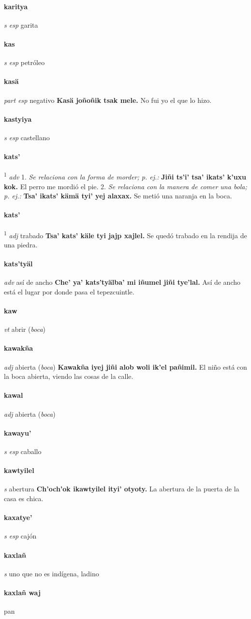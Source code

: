 \documentclass{scrbook}
\newcommand{\entry}[1]{\paragraph{#1}}
\newcommand{\onedefinition}[1]{#1.}
\newcommand{\defsuperscript}[1]{\textsuperscript{1}}
\newcommand{\nontranslationdef}[1]{\textit{#1}}
\newcommand{\partofspeech}[1]{\textit{#1}}
\newcommand{\spanishtranslation}[1]{#1}
\newcommand{\clarification}[1]{(\textit{#1})}
\newcommand{\cholexample}[1]{\textbf{#1}}
\newcommand{\exampletranslation}[1]{#1}
\begin{document}
\begin{multicols}{2}
\entry{karitya}
\partofspeech{s esp}
\spanishtranslation{garita}

\entry{kas}
\partofspeech{s esp}
\spanishtranslation{petróleo}

\entry{kasä}
\partofspeech{part esp}
\spanishtranslation{negativo}
\cholexample{Kasä joñoñik tsak mele.}
\exampletranslation{No fui yo el que lo hizo.}

\entry{kastyiya}
\partofspeech{s esp}
\spanishtranslation{castellano}

\entry{kats'}
\defsuperscript{1}
\partofspeech{adv}
\onedefinition{1}
\nontranslationdef{Se relaciona con la forma de morder; p. ej.:}
\cholexample{Jiñi ts'i' tsa' ikats' k'uxu kok.}
\exampletranslation{El perro me mordió el pie.}
\onedefinition{2}
\nontranslationdef{Se relaciona con la manera de comer una bola; p. ej.:}
\cholexample{Tsa' ikats' kämä tyi' yej alaxax.}
\exampletranslation{Se metió una naranja en la boca.}

\entry{kats'}
\defsuperscript{2}
\partofspeech{adj}
\spanishtranslation{trabado}
\cholexample{Tsa' kats' käle tyi jajp xajlel.}
\exampletranslation{Se quedó trabado en la rendija de una piedra.}

\entry{kats'tyäl}
\partofspeech{adv}
\spanishtranslation{así de ancho}
\cholexample{Che' ya' kats'tyälba' mi iñumel jiñi tye'lal.}
\exampletranslation{Así de ancho está el lugar por donde pasa el tepezcuintle.}

\entry{kaw}
\partofspeech{vt}
\spanishtranslation{abrir}
\clarification{boca}

\entry{kawakña}
\partofspeech{adj}
\spanishtranslation{abierta}
\clarification{boca}
\cholexample{Kawakña iyej jiñi alob woli ik'el pañimil.}
\exampletranslation{El niño está con la boca abierta, viendo las cosas de la calle.}

\entry{kawal}
\partofspeech{adj}
\spanishtranslation{abierta}
\clarification{boca}

\entry{kawayu'}
\partofspeech{s esp}
\spanishtranslation{caballo}

\entry{kawtyilel}
\partofspeech{s}
\spanishtranslation{abertura}
\cholexample{Ch'och'ok ikawtyilel ityi' otyoty.}
\exampletranslation{La abertura de la puerta de la casa es chica.}

\entry{kaxatye'}
\partofspeech{s esp}
\spanishtranslation{cajón}

\entry{kaxlañ}
\partofspeech{s}
\spanishtranslation{uno que no es indígena, ladino}

\entry{kaxlañ waj}
\spanishtranslation{pan}


\end{multicols}
\end{document}
